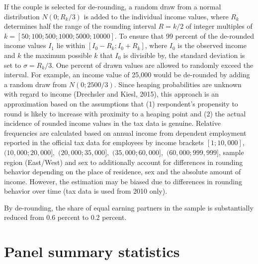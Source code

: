 \documentclass[a4paper,11pt]{scrartcl}
\begin{document}
\begin{appendix}
	If the couple is selected for de-rounding, a random draw from a normal distribution $N (0; R_k /3)$ is added to the individual income values, where $R_k$  determines half the range of the rounding interval $R = k/2$ of integer multiples of $k = [50; 100; 500; 1000; 5000; 10000]$. To ensure that 99 percent of the de-rounded income values $I_1$ lie within $[I_0 - R_k ; I_0 + R_k ]$, where $I_0$ is the observed income and $k$ the maximum possible $k$ that $I_0$ is divisible by, the standard deviation is set to $\sigma = R_k /3$. One percent of drawn values are allowed to randomly exceed the interval. For example, an income value of 25,000 would be de-rounded by adding a random draw from $N(0; 2500/3)$. Since heaping probabilities are unknown with regard to income (Drechsler and Kiesl, 2015), this approach is an approximation based on the assumptions that (1) respondent's propensity to round is likely to increase with proximity to a heaping point \citep{zinn2016statistical} and (2) the actual incidence of rounded income values in the tax data is genuine. Relative frequencies are calculated based on annual income from dependent employment reported in the official tax data for employees by income brackets $[1; 10,000],$ $(10,000; 20,000],$ $(20,000; 35,000],$ $(35,000; 60,000],$ $(60,000; 999,999]$, sample region (East/West) and sex to additionally account for differences in rounding behavior depending on the place of residence, sex and the absolute amount of income. However, the estimation may be biased due to differences in rounding behavior over time (tax data is used from 2010 only).

	By de-rounding, the share of equal earning partners in the sample is substantially reduced from 0.6 percent to 0.2 percent.

	\clearpage
	\section{Panel summary statistics}\label{sumstats}
	\setcounter{table}{0}
	\setcounter{figure}{0}


\end{appendix}
\end{document}

